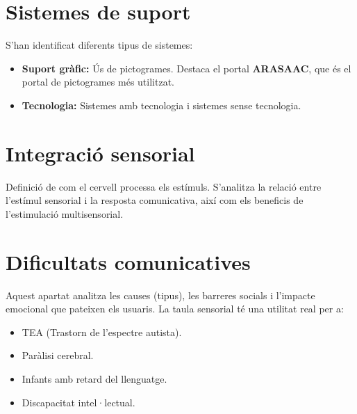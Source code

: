 \section{Sistemes de suport}
S'han identificat diferents tipus de sistemes:
\begin{itemize}
    \item \textbf{Suport gràfic:} Ús de pictogrames. Destaca el portal \textbf{ARASAAC}, que és el portal de pictogrames més utilitzat.
    \item \textbf{Tecnologia:} Sistemes amb tecnologia i sistemes sense tecnologia.
\end{itemize}

\section{Integració sensorial}
Definició de com el cervell processa els estímuls. S'analitza la relació entre l'estímul sensorial i la resposta comunicativa, així com els beneficis de l'estimulació multisensorial.

\section{Dificultats comunicatives}
Aquest apartat analitza les causes (tipus), les barreres socials i l'impacte emocional que pateixen els usuaris. La taula sensorial té una utilitat real per a:
\begin{itemize}
    \item TEA (Trastorn de l'espectre autista).
    \item Paràlisi cerebral.
    \item Infants amb retard del llenguatge.
    \item Discapacitat intel·lectual.
\end{itemize}
